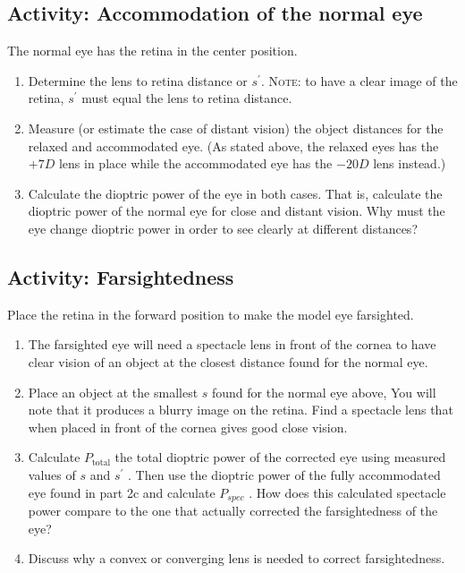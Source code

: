 \subsection{Activity: Accommodation of the normal eye}
The normal eye has the retina in the center position.
\begin{enumerate}
	\item Determine the lens to retina distance or $s^{\prime}$. \textsc{Note:}  to have a clear image of the retina, $s^{\prime}$ must equal the lens to retina distance.
	\item Measure (or estimate the case of distant vision) the object distances for the relaxed and accommodated eye. (As stated above, the relaxed eyes has the $+7 D$ lens in place while the accommodated eye has the $-20 D$ lens instead.)
	\item Calculate the dioptric power of the eye in both cases. That is, calculate the dioptric power of the normal eye for close and distant vision.
Why must the eye change dioptric power in order to see clearly at different distances?
\end{enumerate}

\subsection{Activity: Farsightedness}
Place the retina in the forward position to make the model eye farsighted.  \begin{enumerate}
	 \item The farsighted eye will need a spectacle lens in front of the cornea to have clear vision of an object at the closest distance found for the normal eye.
	\item Place an object at the smallest $s$ found for the normal eye above, You will note that it produces a blurry image on the retina. Find a spectacle lens that when placed in front of the cornea gives good close vision.
	\item Calculate $P_{\textrm{total}}$ the total dioptric power of the corrected eye using measured values of $s$ and $s^{\prime}$ . Then use the dioptric power of the fully accommodated eye found in part 2c and calculate $P_{spec}$ . How does this calculated spectacle power compare to the one that actually corrected the farsightedness of the eye?
	\item Discuss why a convex or converging lens is needed to correct farsightedness.
\end{enumerate}

